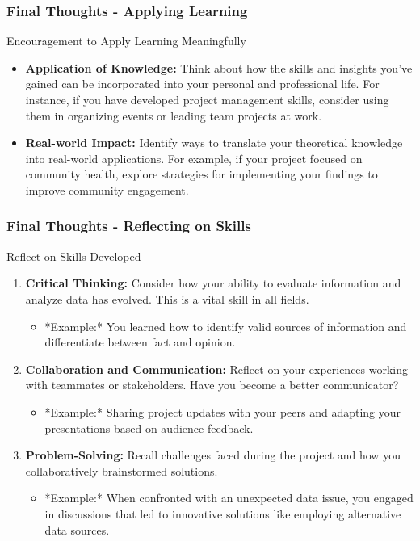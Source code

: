 \documentclass[aspectratio=169]{beamer}
\begin{document}
\begin{frame}[fragile]
    \frametitle{Final Thoughts - Applying Learning}
    \begin{block}{Encouragement to Apply Learning Meaningfully}
        \begin{itemize}
            \item \textbf{Application of Knowledge:} 
            Think about how the skills and insights you've gained can be incorporated into your personal and professional life. For instance, if you have developed project management skills, consider using them in organizing events or leading team projects at work.
            \item \textbf{Real-world Impact:} 
            Identify ways to translate your theoretical knowledge into real-world applications. For example, if your project focused on community health, explore strategies for implementing your findings to improve community engagement.
        \end{itemize}
    \end{block}
\end{frame}

\begin{frame}[fragile]
    \frametitle{Final Thoughts - Reflecting on Skills}
    \begin{block}{Reflect on Skills Developed}
        \begin{enumerate}
            \item \textbf{Critical Thinking:} 
            Consider how your ability to evaluate information and analyze data has evolved. This is a vital skill in all fields.
            \begin{itemize}
                \item *Example:* You learned how to identify valid sources of information and differentiate between fact and opinion.
            \end{itemize}
            \item \textbf{Collaboration and Communication:} 
            Reflect on your experiences working with teammates or stakeholders. Have you become a better communicator?
            \begin{itemize}
                \item *Example:* Sharing project updates with your peers and adapting your presentations based on audience feedback.
            \end{itemize}
            \item \textbf{Problem-Solving:} 
            Recall challenges faced during the project and how you collaboratively brainstormed solutions.
            \begin{itemize}
                \item *Example:* When confronted with an unexpected data issue, you engaged in discussions that led to innovative solutions like employing alternative data sources.
            \end{itemize}
        \end{enumerate}
    \end{block}
\end{frame}
\end{document}
